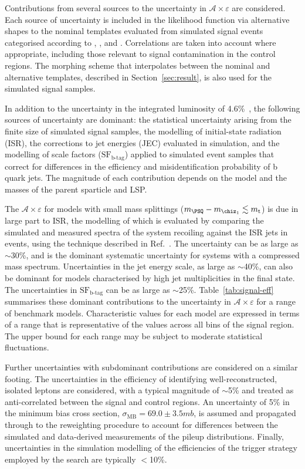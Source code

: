 Contributions from several sources to the uncertainty in
$\mathcal{A}\times\varepsilon$ are considered. Each source of
uncertainty is included in the likelihood function via alternative
shapes to the nominal \HTmiss templates evaluated from simulated
signal events categorised according to \njet, \nb, and
\scalht. Correlations are taken into account where appropriate,
including those relevant to signal contamination in the control
regions. The morphing scheme that interpolates between the nominal and
alternative \HTmiss templates, described in Section~\ref{sec:result},
is also used for the simulated signal samples.

In addition to the uncertainty in the integrated luminosity of
4.6\%~\cite{lumi}, the following sources of uncertainty are dominant:
the statistical uncertainty arising from the finite size of simulated
signal samples, the modelling of initial-state radiation (ISR), the
corrections to jet energies (JEC) evaluated in simulation, and the
modelling of scale factors ($\text{SF}_\text{b-tag}$) applied to
simulated event samples that correct for differences in the efficiency
and misidentification probability of b quark jets. The magnitude of
each contribution depends on the model and the masses of the parent
sparticle and LSP. 

The $\mathcal{A}\times\varepsilon$ for models with small mass
splittings (\eg $m_{\PSQ} - m_{\chiz_1} \lesssim m_{\text t}$) is due
in large part to ISR, the modelling of which is evaluated by comparing
the simulated and measured \Pt spectra of the system recoiling against
the ISR jets in \ttbar events, using the technique described in
Ref.~\cite{single-lepton-stop}. The uncertainty can be as large as
$\sim$30\%, and is the dominant systematic uncertainty for systems
with a compressed mass spectrum. Uncertainties in the jet energy
scale, as large as $\sim$40\%, can also be dominant for models
characterised by high jet multiplicities in the final state. The
uncertainties in $\text{SF}_\text{b-tag}$ can be as large as
$\sim$25\%. Table~\ref{tab:signal-eff} summarises these dominant
contributions to the uncertainty in $\mathcal{A}\times\varepsilon$ for
a range of benchmark models. Characteristic values for each model are
expressed in terms of a range that is representative of the values
across all bins of the signal region. The upper bound for each range
may be subject to moderate statistical fluctuations. 

Further uncertainties with subdominant contributions are considered on
a similar footing. The uncertainties in the efficiency of identifying
well-reconstructed, isolated leptons are considered, with a typical
magnitude of $\sim$5\% and treated as anti-correlated between the
signal and control regions. An uncertainty of 5\% in the minimum bias
cross section, $\sigma_\text{MB} = 69.0 \pm 3.5\unit{mb}$, is assumed
and propagated through to the reweighting procedure to account for
differences between the simulated and data-derived measurements of the
pileup distributions. Finally, uncertainties in the simulation
modelling of the efficiencies of the trigger strategy employed by the
search are typically $<$10\%.

